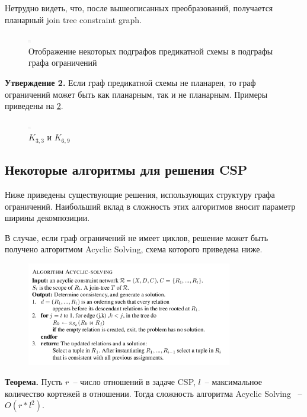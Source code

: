 \documentclass[12pt]{article}
\begin{document}
Нетрудно видеть, что, после вышеописанных преобразований, получается планарный join tree constraint graph.

\begin{figure}[htb]
\centering
\includegraphics[width=0.01\textwidth]{constraint_graph.png}
\caption{Отображение некоторых подграфов предикатной схемы в подграфы графа ограничений}
\label{fig:induced_to_constraint}
\end{figure}

\textbf{Утверждение 2.} Если граф предикатной схемы не планарен, то граф ограничений может быть как планарным, 
так и не планарным.
Примеры приведены на \ref{fig:planar_non_planar}. 

\begin{figure}[htb]
\centering
\includegraphics[width=0.01\textwidth]{constraint_graph.png}
\caption{$K_{3,3}$ и $K_{6,9}$}
\label{fig:planar_non_planar}
\end{figure}


\subsection{Некоторые алгоритмы для решения CSP}
Ниже приведены существующие решения, использующих структуру графа ограничений. Наибольший вклад в сложность этих 
алгоритмов вносит параметр ширины декомпозиции.

В случае, если граф ограничений не имеет циклов, решение может быть получено алгоритмом Acyclic Solving,
схема которого приведена ниже.
\begin{figure}[htb]
\centering
\includegraphics[width=0.8\textwidth]{algo_as.png}
\label{fig:algo_acyclic}
\end{figure}

\textbf{Теорема.} Пусть $r$~-- число отношений в задаче CSP, $l$~-- максимальное количество кортежей в отношении.
Тогда сложность алгоритма Acyclic Solving ~-- $O(r*l^2)$.\cite{CSP10}
\end{document}
